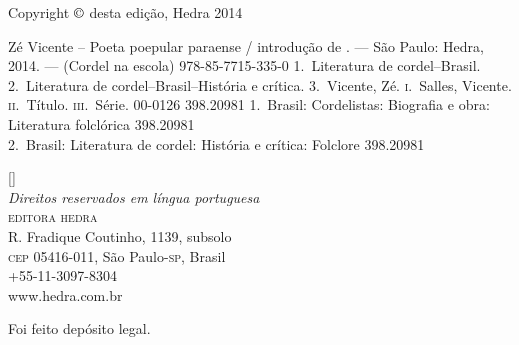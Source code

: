 
\clearpage

\begingroup
\centering
\footnotesize

Copyright $\copyright$ desta edição, Hedra 2014\\\medskip



%
%
%
%

\bigskip

%
{Zé Vicente -- Poeta poepular paraense / introdução de \introdutor. --- São Paulo: Hedra, 2014. --- (Cordel na escola)}
{978-85-7715-335-0}%
{1.~Literatura de cordel--Brasil. 2.~Literatura de
cordel--Brasil--História e crítica. 3.~Vicente, Zé.
\textsc{i}.~Salles, Vicente. \textsc{ii}.~Título.
\textsc{iii}.~Série.}%
{00-0126}%
{398.20981}%
{1.~Brasil: Cordelistas: Biografia e obra: Literatura folclórica 398.20981\\
2.~Brasil: Literatura de cordel: História e crítica: Folclore 398.20981}

\vfill

[\the\year]\\
\textit{Direitos reservados em língua portuguesa}\\
\textsc{editora hedra}\\
R. Fradique Coutinho, 1139, subsolo\\
\textsc{cep} 05416-011,  São Paulo-\textsc{sp}, Brasil\\
+55-11-3097-8304\\ 
www.hedra.com.br\\\smallskip

Foi feito depósito legal.

\par
\endgroup
\clearpage
